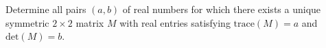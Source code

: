 Determine all pairs \((a, b)\) of real numbers for which there exists a unique symmetric \(2\times 2\) matrix \(M\) with real entries satisfying \(\mathrm{trace}(M)=a\) and \(\mathrm{det}(M)=b\).